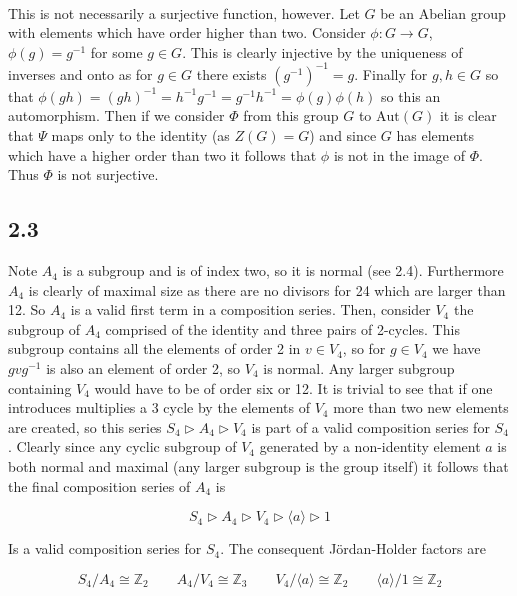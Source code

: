 \documentclass{article}
\begin{document}
\paragraph{}
This is not necessarily a surjective function, however. Let $G$ be an Abelian group with elements 
which have order higher than two. Consider $\phi:G\rightarrow G$, $\phi(g) = g^{-1}$ 
for some $g \in G$. This is clearly injective by the uniqueness of inverses and onto as for $g \in G$ 
there exists $(g^{-1})^{-1} = g$. Finally for $g,h \in G$ so that $\phi(gh) = (gh)^{-1} = h^{-1}g^{-1} = g^{-1}h^{-1} = \phi(g)\phi(h)$ 
so this an automorphism. Then if we consider $\Phi$ from this group $G$ to $\text{Aut}(G)$ it 
is clear that $\Psi$ maps only to the identity (as $Z(G) = G$) and since $G$ has elements which 
have a higher order than two it follows that $\phi$ is not in the image of $\Phi$. Thus $\Phi$ is 
not surjective.

\subsection*{2.3}
Note $A_4$ is a subgroup and is of index two, so it is normal (see 2.4). Furthermore $A_4$ is clearly of maximal 
size as there are no divisors for 24 which are larger than 12. So $A_4$ is a valid first term in a 
composition series. Then, consider $V_4$ the subgroup of $A_4$ comprised of the identity and three 
pairs of 2-cycles. This subgroup contains all the elements of order 2 in $v \in V_4$, so for 
$g \in V_4$ we have $gvg^{-1}$ is also an element of order 2, so $V_4$ is normal. Any larger 
subgroup containing $V_4$ would have to be of order six or 12. It is trivial to see that if one introduces multiplies a 
3 cycle by the elements of $V_4$ more than two new elements are created, so this series $S_4 \triangleright A_4 \triangleright V_4$ 
is part of a valid composition series for $S_4$. Clearly since any cyclic subgroup of $V_4$ generated by a 
non-identity element $a$ is both normal and maximal (any larger subgroup is the group itself) it follows that 
the final composition series of $A_4$ is 

\begin{equation*}
    S_4 \triangleright A_4 \triangleright V_4 \triangleright \langle a \rangle \triangleright {1}
\end{equation*}

Is a valid composition series for $S_4$. The consequent J\"ordan-Holder factors are 

\begin{equation*}
    S_4/A_4 \cong \mathbb{Z}_2 \qquad A_4/V_4 \cong \mathbb{Z}_3 \qquad V_4/\langle a\rangle \cong \mathbb{Z}_2 \qquad \langle a \rangle/{1} \cong \mathbb{Z}_2
\end{equation*}
\end{document}
